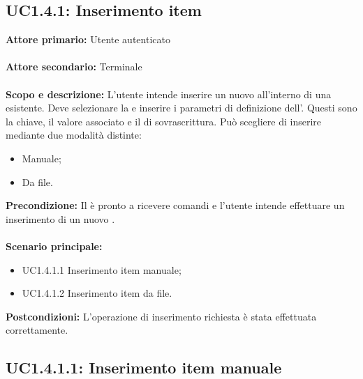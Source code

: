 \documentclass{scalatekids-article}
\begin{document}
\subsection{UC1.4.1: Inserimento item}

\textbf{Attore primario:} Utente autenticato\\ \\
\textbf{Attore secondario:} Terminale\\ \\
\textbf{Scopo e descrizione:} L'utente intende inserire un nuovo  all'interno di una  esistente. Deve selezionare la  e inserire i parametri di definizione dell'. Questi sono la chiave, il valore associato e il  di sovrascrittura. Può scegliere di inserire
mediante due modalità distinte:
\begin{itemize}
\item Manuale;
\item Da file.
\end{itemize}
\textbf{Precondizione:} Il  è pronto a ricevere comandi e l'utente intende effettuare un inserimento di un nuovo .\\ \\
\textbf{Scenario principale:}
\begin{itemize}
\item UC1.4.1.1 Inserimento item manuale;
\item UC1.4.1.2 Inserimento item da file.
\end{itemize}
\textbf{Postcondizioni:} L'operazione di inserimento richiesta è stata effettuata correttamente.

\subsection{UC1.4.1.1: Inserimento item manuale}
\end{document}
